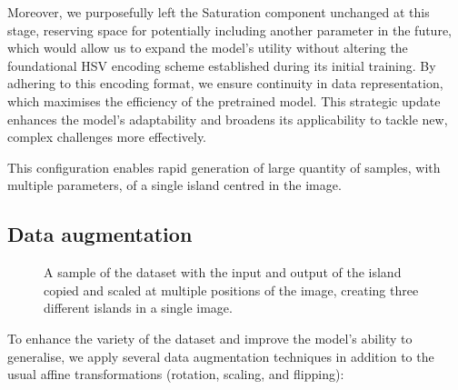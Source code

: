 Moreover, we purposefully left the Saturation component unchanged at this stage, reserving space for potentially including another parameter in the future, which would allow us to expand the model's utility without altering the foundational HSV encoding scheme established during its initial training. By adhering to this encoding format, we ensure continuity in data representation, which maximises the efficiency of the pretrained model. This strategic update enhances the model's adaptability and broadens its applicability to tackle new, complex challenges more effectively.

This configuration enables rapid generation of large quantity of samples, with multiple parameters, of a single island centred in the image.

\subsection{Data augmentation}
\label{sec:coral-island-data-augmentation}

\begin{figure}[H]
    \caption{A sample of the dataset with the input and output of the island copied and scaled at multiple positions of the image, creating three different islands in a single image.}
    \label{fig:coral-island-cGAN-examples}
\end{figure}

To enhance the variety of the dataset and improve the model's ability to generalise, we apply several data augmentation techniques in addition to the usual affine transformations (rotation, scaling, and flipping):

